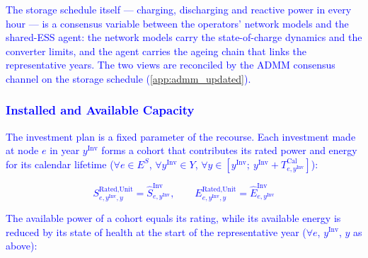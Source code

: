 \textcolor{blue}{The storage schedule itself --- charging, discharging and reactive power in every hour --- is a
consensus variable between the operators' network models and the shared-ESS agent: the network models carry
the state-of-charge dynamics and the converter limits, and the agent carries the ageing chain that links the
representative years. The two views are reconciled by the ADMM consensus channel on the storage schedule
(\ref{app:admm_updated}).}


\subsubsection{\textcolor{blue}{Installed and Available Capacity}}

\textcolor{blue}{The investment plan is a fixed parameter of the recourse. Each investment made at node $e$
in year $y^{\text{Inv}}$ forms a cohort that contributes its rated power and energy for its calendar
lifetime ($\forall e \in E^S$, $\forall y^\text{Inv} \in Y$, $\forall y \in [y^\text{Inv};~y^\text{Inv}+T^\text{Cal}_{e,y^\text{Inv}}]$):}

\textcolor{blue}{
    \begin{equation}
        S^{\text{Rated,Unit}}_{e,y^\text{Inv},y} = \hat{S}^{\text{Inv}}_{e,y^\text{Inv}}, \qquad
        E^{\text{Rated,Unit}}_{e,y^\text{Inv},y} = \hat{E}^{\text{Inv}}_{e,y^\text{Inv}}
        \label{eq:cohort_rated}
    \end{equation}
}

\textcolor{blue}{The available power of a cohort equals its rating, while its available energy is reduced by
its state of health at the start of the representative year ($\forall e$, $y^\text{Inv}$, $y$ as above):}

